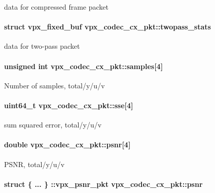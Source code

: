 data for compressed frame packet \hypertarget{structvpx__codec__cx__pkt_a53db8576979fa7335e478eb849b256f1}{
\paragraph[{twopass\-\_\-stats}]{\setlength{\rightskip}{0pt plus 5cm}struct {\bf vpx\-\_\-fixed\-\_\-buf} vpx\-\_\-codec\-\_\-cx\-\_\-pkt\-::twopass\-\_\-stats}}\label{structvpx__codec__cx__pkt_a53db8576979fa7335e478eb849b256f1}
data for two-\/pass packet \hypertarget{structvpx__codec__cx__pkt_a4d3fc7eb2d19c5913c6f3f474e5cf77b}{
\paragraph[{samples}]{\setlength{\rightskip}{0pt plus 5cm}unsigned int vpx\-\_\-codec\-\_\-cx\-\_\-pkt\-::samples\mbox{[}4\mbox{]}}}\label{structvpx__codec__cx__pkt_a4d3fc7eb2d19c5913c6f3f474e5cf77b}
Number of samples, total/y/u/v \hypertarget{structvpx__codec__cx__pkt_ad65e918d3f26743cc7a8898b88bcb397}{
\paragraph[{sse}]{\setlength{\rightskip}{0pt plus 5cm}uint64\-\_\-t vpx\-\_\-codec\-\_\-cx\-\_\-pkt\-::sse\mbox{[}4\mbox{]}}}\label{structvpx__codec__cx__pkt_ad65e918d3f26743cc7a8898b88bcb397}
sum squared error, total/y/u/v \hypertarget{structvpx__codec__cx__pkt_a63744aeceb50355d6402d55309c151b6}{
\paragraph[{psnr}]{\setlength{\rightskip}{0pt plus 5cm}double vpx\-\_\-codec\-\_\-cx\-\_\-pkt\-::psnr\mbox{[}4\mbox{]}}}\label{structvpx__codec__cx__pkt_a63744aeceb50355d6402d55309c151b6}
P\-S\-N\-R, total/y/u/v \hypertarget{structvpx__codec__cx__pkt_ac91dc0ee23d3d939b85eb82eb5ccc042}{
\paragraph[{psnr}]{\setlength{\rightskip}{0pt plus 5cm}struct \{ ... \} \-::vpx\-\_\-psnr\-\_\-pkt  vpx\-\_\-codec\-\_\-cx\-\_\-pkt\-::psnr}}\label{structvpx__codec__cx__pkt_ac91dc0ee23d3d939b85eb82eb5ccc042}
